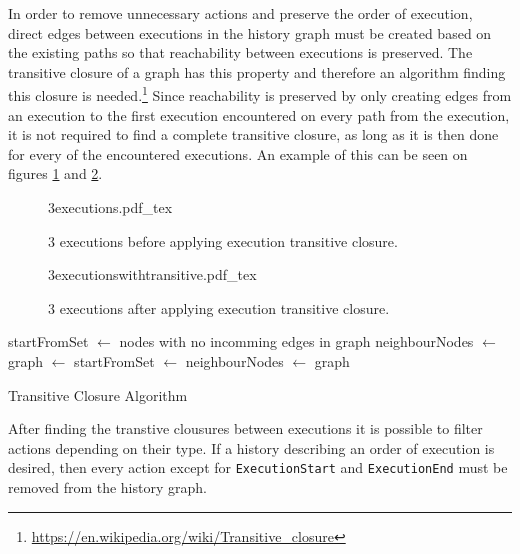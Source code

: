 	\newpar In order to remove unnecessary actions and preserve the order of execution, direct edges between executions in the history graph must be created based on the existing paths so that reachability between executions is preserved. The transitive closure of a graph has this property and therefore an algorithm finding this closure is needed.\footnote{\url{https://en.wikipedia.org/wiki/Transitive_closure}} Since reachability is preserved by only creating edges from an execution to the first execution encountered on every path from the execution, it is not required to find a complete transitive closure, as long as it is then done for every of the encountered executions. An example of this can be seen on figures \ref{fig:connect:3executions} and \ref{fig:connect:3executionstrans}.
	
	\begin{figure}
		\centering
		{3executions.pdf_tex}
		\caption{3 executions before applying execution transitive closure.}
		\label{fig:connect:3executions}
	\end{figure}
	
	\begin{figure}
		\centering
		{3executionswithtransitive.pdf_tex}
		\caption{3 executions after applying execution transitive closure.}
		\label{fig:connect:3executionstrans}
	\end{figure}
	
	\begin{algorithm}
		\begin{algorithmic}
			\State startFromSet $\leftarrow$ nodes with no incomming edges in graph
				\State neighbourNodes $\leftarrow$ 
						\State graph $\leftarrow$ 
						\State startFromSet $\leftarrow$ 
					\Else
						\State neighbourNodes $\leftarrow$ 
					\EndIf
				\EndFor
			\EndFor
			\State 
			\Return graph
		\EndFunction
		\end{algorithmic}
		\caption{Transitive Closure Algorithm}
	\end{algorithm}

	
	\newpar After finding the transtive clousures between executions it is possible to filter actions depending on their type. If a history describing an order of execution is desired, then every action except for \texttt{ExecutionStart} and \texttt{ExecutionEnd} must be removed from the history graph. 
	
